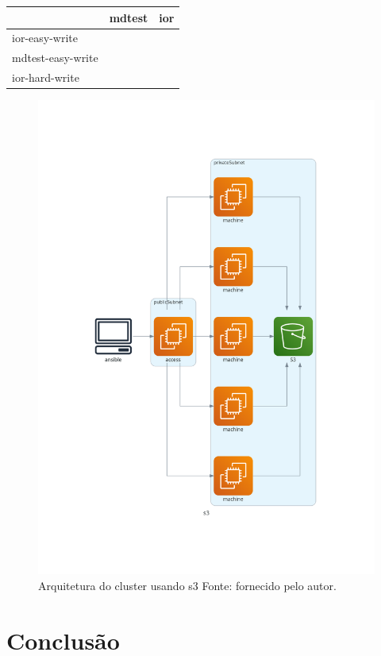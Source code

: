 \documentclass[article,a4paper,12pt,brazil,sumario=tradicional]{abntex2}
\begin{document}
\begin{table}[htb]
	\begin{tabular}{|l|l|l|}
		\hline
		& mdtest & ior \\ \hline
		ior-easy-write    &        &     \\ \hline
		mdtest-easy-write &        &     \\ \hline
		ior-hard-write    &        &     \\ \hline
	\end{tabular}
\end{table}

\begin{figure}[htb]
	\centering
	\includegraphics[width=1\textwidth]{s3.png}
	\caption{Arquitetura do cluster usando s3 Fonte: fornecido pelo autor.}
	\label{fig:s3}
\end{figure}

\section{Conclusão}
\end{document}
